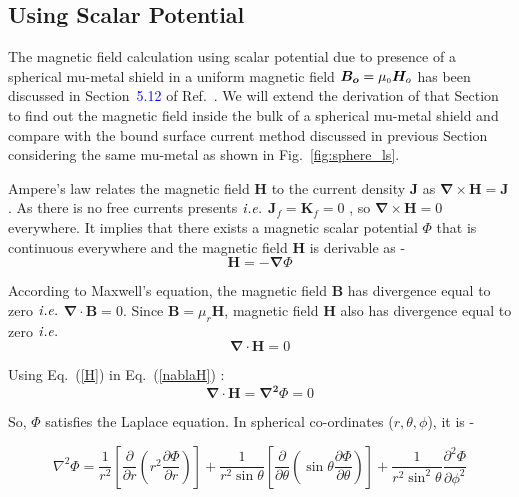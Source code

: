 \subsection{Using Scalar Potential}
The magnetic field calculation using scalar potential due to presence of a spherical mu-metal shield in a uniform magnetic field \(\bm{B_o}= \mu_{\scriptscriptstyle 0} \bm H_o\) has been discussed in Section~\textcolor{blue}{5.12} of Ref.~\cite{jackson}. We will extend the derivation of that Section to find out the magnetic field inside the bulk of a spherical mu-metal shield and compare with the bound surface current method discussed in previous Section considering the same mu-metal as shown in Fig.~\ref{fig:sphere_ls}.


Ampere's law relates the magnetic field $\bm{H}$ to the current density $\bm{J}$ as \(\bm{\nabla}\times\bm{H}=\bm{J}\). As there is no free currents presents $\it{i.e.}$ \(\bm{J}_f=\bm{K}_f=0\) , so \(\bm{\nabla}\times\bm{H}=0\) everywhere. It implies that there exists a magnetic scalar potential \(\Phi\) that is continuous  everywhere and the  magnetic field $\bm{H}$ is derivable as -
\begin{equation}\label{H}
\bm{H}=-\bm{\nabla}\Phi
\end{equation} 

According to Maxwell's equation, the magnetic field $\bm{B}$ has divergence equal to zero $\it{i.e.}$ \(\bm{\nabla}\cdot\bm{B}=0\). Since \(\bm{B}=\mu_r\bm{H}\), magnetic field $\bm{H}$ also has divergence equal to zero $\it{i.e.}$
\begin{equation}\label{nablaH}
\bm{\nabla}\cdot\bm{H}=0
\end{equation}

Using Eq.~(\ref{H}) in Eq.~(\ref{nablaH}) :
\begin{equation}
\bm{\nabla}\cdot\bm{H}=\bm{\nabla^2}\Phi=0
\end{equation}


So, $\Phi$ satisfies the Laplace equation.  In spherical co-ordinates ($r, \theta, \phi$), it is -

\begin{equation}
\nabla^2 \Phi=\frac{1}{r^2}\left[\frac{\partial }{\partial r} \left(r^2\frac{\partial \Phi}{\partial r}\right) \right]+ \frac{1}{r^2 \sin\theta}\left[\frac{\partial }{\partial \theta} \left(\sin\theta\frac{\partial \Phi}{\partial \theta}\right) \right]+ \frac{1}{r^2 \sin^2\theta}\frac{\partial^2 \Phi}{\partial \phi^2}
\end{equation}

